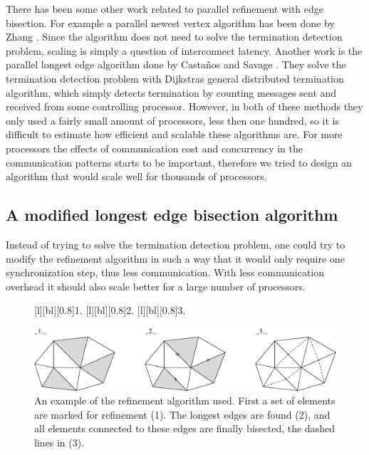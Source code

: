 There has been some other work related to parallel refinement with
edge bisection. For example a parallel newest vertex algorithm has
been done by Zhang \cite{Zha2005a}. Since the algorithm does not need
to solve the termination detection problem, scaling is simply a
question of interconnect latency. Another work is the parallel longest
edge algorithm done by Casta\~nos and Savage \cite{CasSav1999a}. They
solve the termination detection problem with Dijkstras general
distributed termination algorithm, which simply detects termination by
counting messages sent and received from some controlling
processor. However, in both of these methods they only used a fairly
small amount of processors, less then one hundred, so it is difficult
to estimate how efficient and scalable these algorithms are. For more
processors the effects of communication cost and concurrency in the
communication patterns starts to be important, therefore we tried to
design an algorithm that would scale well for thousands of processors.

\subsection{A modified longest edge bisection algorithm}
\label{sect:modlong}

Instead of trying to solve the termination detection problem, one could try to modify the refinement algorithm in such a way that it would only require one synchronization step, thus less communication. With less communication overhead it should also scale better for a large number of processors.

\begin{figure}[htb]
 [l][bl][0.8]{1.}  [l][bl][0.8]{2.}
 [l][bl][0.8]{3.}  \begin{center}
 \includegraphics[width=1.0\columnwidth]{chapters/hoffman-4/eps/mref.eps}
 \end{center} \caption{An example of the refinement algorithm
 used. First a set of elements are marked for refinement (1). The
 longest edges are found (2), and all elements connected to these
 edges are finally bisected, the dashed lines in (3).}
 \label{fig:bisectexample}
\end{figure}

